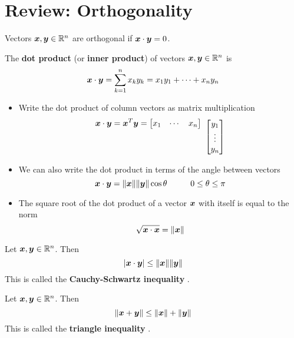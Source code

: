 \section{Review: Orthogonality}

\begin{bigidea}
Vectors $\boldsymbol{x},\boldsymbol{y} \in \mathbb{R}^n$ are orthogonal if $\boldsymbol{x} \cdot \boldsymbol{y} = 0$.
\end{bigidea}

\begin{definition}
The {\bf dot product} (or {\bf inner product}) \cite[p.282]{KN} of vectors $\boldsymbol{x}, \boldsymbol{y} \in \mathbb{R}^n$ is
$$
\boldsymbol{x} \cdot \boldsymbol{y} = \sum_{k=1}^n x_k y_k = x_1y_1 + \cdots + x_ny_n
$$
\end{definition}

\begin{note}
\begin{itemize}
\item Write the dot product of column vectors as matrix multiplication
$$
\bs{x} \cdot \bs{y} = \bs{x}^T \bs{y} = 
\begin{bmatrix} x_1 & \cdots & x_n \end{bmatrix}
\raisebox{-5.7mm}{ $ \begin{bmatrix} y_1 \\ \vdots \\ y_n \end{bmatrix} $}
$$
\item We can also write the dot product in terms of the angle between vectors
$$
\bs{x} \cdot \bs{y} = \| \bs{x} \| \| \bs{y} \| \cos \theta \hspace{10mm} 0 \leq \theta \leq \pi
$$
\item The square root of the dot product of a vector $\boldsymbol{x}$ with itself is equal to the norm
$$
\sqrt{ \boldsymbol{x} \cdot \boldsymbol{x} } = \| \boldsymbol{x} \|
$$
\end{itemize}
\end{note}

\begin{theorem}
Let $\boldsymbol{x} , \boldsymbol{y} \in \mathbb{R}^n$. Then
$$
| \boldsymbol{x} \cdot \boldsymbol{y} | \leq \| \boldsymbol{x} \| \| \boldsymbol{y} \|
$$
This is called the {\bf Cauchy-Schwartz inequality} \cite[p.284]{KN}.
\end{theorem}

\begin{theorem}
Let $\boldsymbol{x} , \boldsymbol{y} \in \mathbb{R}^n$. Then
$$
\| \boldsymbol{x} + \boldsymbol{y} \| \leq \| \boldsymbol{x} \| + \| \boldsymbol{y} \|
$$
This is called the {\bf triangle inequality} \cite[p.284]{KN}.
\end{theorem}

